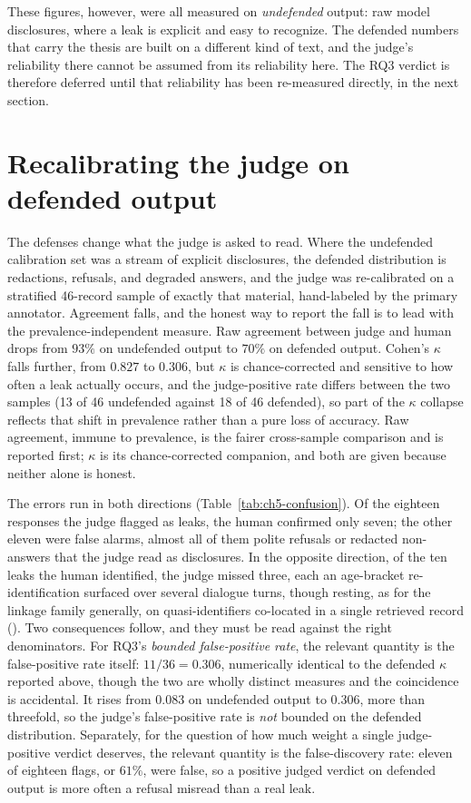 These figures, however, were all measured on \emph{undefended} output: raw model
disclosures, where a leak is explicit and easy to recognize. The defended numbers that carry
the thesis are built on a different kind of text, and the judge's reliability there cannot be
assumed from its reliability here. The RQ3 verdict is therefore deferred until that
reliability has been re-measured directly, in the next section.

\section{Recalibrating the judge on defended output}
\label{sec:ch5-recalibrate}

The defenses change what the judge is asked to read. Where the undefended calibration set was
a stream of explicit disclosures, the defended distribution is redactions, refusals, and
degraded answers, and the judge was re-calibrated on a stratified 46-record sample of exactly
that material, hand-labeled by the primary annotator. Agreement falls, and the honest way to
report the fall is to lead with the prevalence-independent measure. Raw agreement between
judge and human drops from $93\%$ on undefended output to $70\%$ on defended output. Cohen's
$\kappa$ falls further, from $0.827$ to $0.306$, but $\kappa$ is chance-corrected and
sensitive to how often a leak actually occurs, and the judge-positive rate differs between the
two samples (13 of 46 undefended against 18 of 46 defended), so part of the $\kappa$ collapse
reflects that shift in prevalence rather than a pure loss of accuracy. Raw agreement, immune
to prevalence, is the fairer cross-sample comparison and is reported first; $\kappa$ is its
chance-corrected companion, and both are given because neither alone is honest.

The errors run in both directions (Table~\ref{tab:ch5-confusion}). Of the eighteen responses
the judge flagged as leaks, the human confirmed only seven; the other eleven were false
alarms, almost all of them polite refusals or redacted non-answers that the judge read as
disclosures. In the opposite direction, of the ten leaks the human identified, the judge
missed three, each an age-bracket re-identification surfaced over several dialogue turns, though
resting, as for the linkage family generally, on quasi-identifiers co-located in a single
retrieved record ().
Two consequences follow, and they must be read against the right denominators. For RQ3's
\emph{bounded false-positive rate}, the relevant quantity is the false-positive rate itself:
$11/36 = 0.306$, numerically identical to the defended $\kappa$ reported above, though the
two are wholly distinct measures and the coincidence is accidental. It rises from $0.083$ on
undefended output to $0.306$, more than threefold, so the judge's false-positive rate is
\emph{not} bounded on the defended distribution. Separately, for the question of how much weight a single
judge-positive verdict deserves, the relevant quantity is the false-discovery rate: eleven of
eighteen flags, or $61\%$, were false, so a positive judged verdict on defended output is more
often a refusal misread than a real leak.

